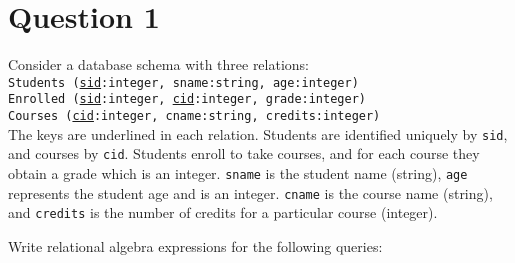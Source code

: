 
\section*{Question 1}

Consider a database schema with three relations:\\

\texttt{Students (\underline{sid}:integer, sname:string, age:integer)}\\
\texttt{Enrolled (\underline{sid}:integer, \underline{cid}:integer, grade:integer)}\\
\texttt{Courses  (\underline{cid}:integer, cname:string, credits:integer)}\\

The keys are underlined in each relation. Students are identified uniquely by \texttt{sid}, and courses by \texttt{cid}. 
Students enroll to take courses, and for each course they obtain a grade which is an integer. \texttt{sname} is 
the student name (string), \texttt{age} represents the student age and is an integer. \texttt{cname} is the course name (string), and \texttt{credits} is the number of credits for a particular course (integer).

Write relational algebra expressions for the following queries:

